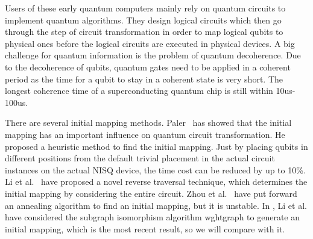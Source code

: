 \documentclass[runningheads]{llncs}
\begin{document}
Users of these early quantum computers mainly rely on quantum circuits to implement quantum algorithms. They design logical circuits which then go through the step of circuit transformation in order to map logical qubits to physical ones before the logical circuits are executed in physical devices. A big challenge for quantum information is the problem of quantum decoherence. Due to the decoherence of qubits, quantum gates need to be applied in a coherent period as the time for a qubit to stay in a coherent state is very short. The longest coherence time of a superconducting quantum chip is still within 10us-100us. 

There are several initial mapping methods. Paler~\cite{Paler2018} has showed that the initial mapping has an important influence on quantum circuit transformation. He proposed a heuristic method to find the initial mapping. Just by placing qubits in different positions from the default trivial placement
 in the actual circuit instances on the actual NISQ device, the time cost can be reduced by up to 10\%. Li et al.~\cite{Li2018} have proposed a novel reverse traversal technique, which determines the initial mapping by considering the entire circuit. Zhou et al.~\cite{Xiangzhen2020} have put forward an annealing algorithm to find an initial mapping, but it is unstable. In \cite{2020Qubit}, Li et al. have considered the subgraph isomorphism algorithm wghtgraph to generate an initial mapping, which is the most recent result, so we will compare with it.
\end{document}
